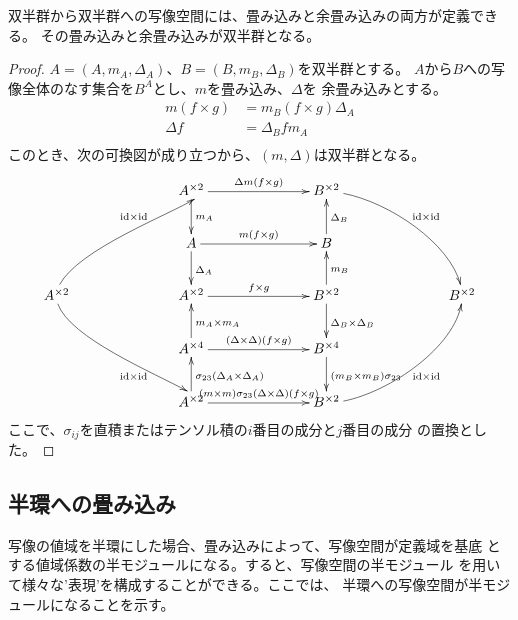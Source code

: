 		\begin{proposition}[畳み込みと余畳み込み]\label{prop:畳み込みと余畳み込み} %
			双半群から双半群への写像空間には、畳み込みと余畳み込みの両方が定義できる。
			その畳み込みと余畳み込みが双半群となる。
		\end{proposition} %
		\begin{proof} %
			$A=(A,m_A,\Delta_A)$、$B=(B,m_B,\Delta_B)$を双半群とする。
			$A$から$B$への写像全体のなす集合を$B^A$とし、$m$を畳み込み、$\Delta$を
			余畳み込みとする。
			\begin{equation*}\begin{split} %
				m(f\times g) &= m_B(f\times g)\Delta_A \\
				\Delta f &= \Delta_B f m_A \\
			\end{split}\end{equation*} %
			このとき、次の可換図が成り立つから、$(m,\Delta)$は双半群となる。
			\begin{equation}\xymatrix@C+4pc{
				& A^{\times 2} \ar[d]^{m_A} \ar[r]^{\Delta m(f\times g)} 
				& B^{\times 2} \ar@(r,u)[rdd]^{\myid\times \myid} \\ 
				& A \ar[d]^{\Delta_A} \ar[r]^{m(f\times g)} & B \ar[u]_{\Delta_B} \\ 
				A^{\times 2} \ar@(u,r)[ruu]^{\myid\times \myid} \ar@(d,r)[rdd]_{\myid\times \myid}
				& A^{\times 2} \ar[r]^{f\times g} 
				& B^{\times 2} \ar[u]_{m_B} \ar[d]^{\Delta_B\times \Delta_B}
				& B^{\times 2} \\
				& A^{\times 4} \ar[u]_{m_A\times m_A} \ar[r]^{(\Delta\times \Delta)(f\times g)} & B^{\times 4} \ar[d]^{(m_B\times m_B)\sigma_{23}} \\
				& A^{\times 2} \ar[u]_{\sigma_{23}(\Delta_A\times \Delta_A)} \ar[r]^{(m\times m)\sigma_{23}(\Delta\times \Delta)(f\times g)} 
				& B^{\times 2} \ar@(r,d)[ruu]_{\myid\times \myid} \\
			}\end{equation}
			ここで、$\sigma_{ij}$を直積またはテンソル積の$i$番目の成分と$j$番目の成分
			の置換とした。
		\end{proof} %

	\subsection{半環への畳み込み}\label{s1:半環への畳み込み} %
		写像の値域を半環にした場合、畳み込みによって、写像空間が定義域を基底
		とする値域係数の半モジュールになる。すると、写像空間の半モジュール
		を用いて様々な'表現'を構成することができる。ここでは、
		半環への写像空間が半モジュールになることを示す。


